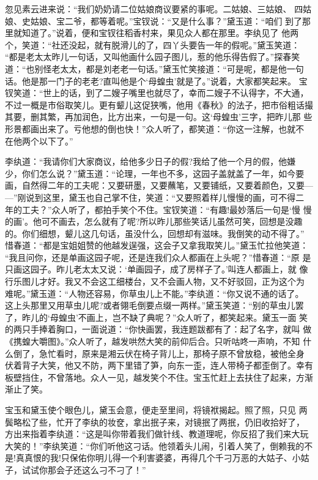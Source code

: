 忽见素云进来说：“我们奶奶请二位姑娘商议要紧的事呢。二姑娘、三姑娘、
四姑娘、史姑娘、宝二爷，都等着呢。”宝钗说：“又是什么事？”黛玉道：“咱们
到了那里就知道了。”说着，便和宝钗往稻香村来，果见众人都在那里。李纨见了
他两个，笑道：“社还没起，就有脱滑儿的了，四丫头要告一年的假呢。”黛玉笑道：
“都是老太太昨儿一句话，又叫他画什么园子图儿，惹的他乐得告假了。”探春笑
道：“也别怪老太太，都是刘老老一句话。”黛玉忙笑接道：“可是呢，都是他一句
话。他是那一门子的老老?直叫他是个‘母蝗虫’就是了。”说着，大家都笑起来。
宝钗笑道：“世上的话，到了二嫂子嘴里也就尽了，幸而二嫂子不认得字，不大通，
不过一概是市俗取笑儿。更有颦儿这促狭嘴，他用《春秋》的法子，把市俗粗话撮
其要，删其繁，再加润色，比方出来，一句是一句。这‘母蝗虫’三字，把昨儿那
些形景都画出来了。亏他想的倒也快！”众人听了，都笑道：“你这一注解，也就不
在他两个以下了。”

李纨道：“我请你们大家商议，给他多少日子的假?我给了他一个月的假，他嫌
少，你们怎么说？”黛玉道：“论理，一年也不多，这园子盖就盖了一年，如今要
画，自然得二年的工夫呢：又要研墨，又要蘸笔，又要铺纸，又要着颜色，又要—
—”刚说到这里，黛玉也自己掌不住，笑道：“又要照着样儿慢慢的画，可不得二
年的工夫？”众人听了，都拍手笑个不住。宝钗笑道：“有趣!最妙落后一句是‘慢
慢的画’。他可不画去，怎么就有了呢?所以昨儿那些笑话儿虽然可笑，回想是没趣
的。你们细想，颦儿这几句话，虽没什么，回想却有滋味。我倒笑的动不得了。”
惜春道：“都是宝姐姐赞的他越发逞强，这会子又拿我取笑儿。”黛玉忙拉他笑道：
“我且问你，还是单画这园子呢，还是连我们众人都画在上头呢？”惜春道：“原
是只画这园子。昨儿老太太又说：‘单画园子，成了房样子了。’叫连人都画上，就
像行乐图儿才好。我又不会这工细楼台，又不会画人物，又不好驳回，正为这个为
难呢。”黛玉道：“人物还容易，你草虫儿上不能。”李纨道：“你又说不通的话了。
这上头那里又用草虫儿呢?或者翎毛倒要点缀一两样。”黛玉笑道：“别的草虫儿罢
了，昨儿的‘母蝗虫’不画上，岂不缺了典呢？”众人听了，都笑起来。黛玉一面
笑的两只手捧着胸口，一面说道：“你快画罢，我连题跋都有了：起了名字，就叫
做《携蝗大嚼图》。”众人听了，越发哄然大笑的前仰后合。只听咕咚一声响，不知
什么倒了，急忙看时，原来是湘云伏在椅子背儿上，那椅子原不曾放稳，被他全身
伏着背子大笑，他又不防，两下里错了笋，向东一歪，连人带椅子都歪倒了。幸有
板壁挡住，不曾落地。众人一见，越发笑个不住。宝玉忙赶上去扶住了起来，方渐
渐止了笑。

宝玉和黛玉使个眼色儿，黛玉会意，便走至里间，将镜袱揭起。照了照，只见
两鬓略松了些，忙开了李纨的妆奁，拿出抿子来，对镜抿了两抿，仍旧收拾好了，
方出来指着李纨道：“这是叫你带着我们做针线、教道理呢，你反招了我们来大玩
大笑的！”李纨笑道：“你们听他这刁话。他领着头儿闹，引着人笑了，倒赖我的不
是!真真恨的我!只保佑你明儿得一个利害婆婆，再得几个千刁万恶的大姑子、小姑
子，试试你那会子还这么刁不刁了！”

